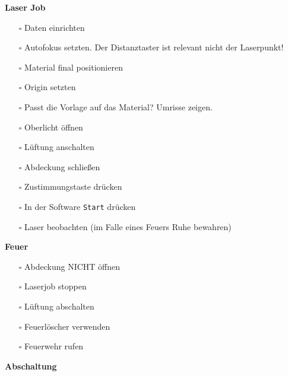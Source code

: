 \documentclass[]{article}
\providecommand{\tightlist}{%
  \setlength{\itemsep}{0pt}\setlength{\parskip}{0pt}}
\begin{document}
\textbf{Laser Job}

\begin{itemize}
\tightlist
\item[$\square$]
  Daten einrichten\\
\item[$\square$]
  Autofokus setzten. Der Distanztaster ist relevant nicht der
  Laserpunkt!\\
\item[$\square$]
  Material final positionieren\\
\item[$\square$]
  Origin setzten\\
\item[$\square$]
  Passt die Vorlage auf das Material? Umrisse zeigen.
\item[$\square$]
  Oberlicht öffnen\\
\item[$\square$]
  Lüftung anschalten
\item[$\square$]
  Abdeckung schließen\\
\item[$\square$]
  Zustimmungstaste drücken\\
\item[$\square$]
  In der Software \texttt{Start} drücken\\
\item[$\square$]
  Laser beobachten (im Falle eines Feuers Ruhe bewahren)
\end{itemize}

\textbf{Feuer}

\begin{itemize}
\tightlist
\item[$\square$]
  Abdeckung NICHT öffnen\\
\item[$\square$]
  Laserjob stoppen\\
\item[$\square$]
  Lüftung abschalten\\
\item[$\square$]
  Feuerlöscher verwenden\\
\item[$\square$]
  Feuerwehr rufen
\end{itemize}

\textbf{Abschaltung}
\end{document}
